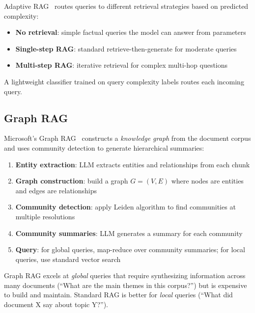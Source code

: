 Adaptive RAG~\cite{jeong2024adaptive} routes queries to different retrieval strategies based on predicted complexity:

\begin{itemize}
  \item \textbf{No retrieval}: simple factual queries the model can answer from parameters
  \item \textbf{Single-step RAG}: standard retrieve-then-generate for moderate queries
  \item \textbf{Multi-step RAG}: iterative retrieval for complex multi-hop questions
\end{itemize}

A lightweight classifier trained on query complexity labels routes each incoming query.

\subsection{Graph RAG}
\label{graph-rag}

Microsoft’s Graph RAG~\cite{edge2024local} constructs a \emph{knowledge graph} from the document corpus and uses community detection to generate hierarchical summaries:

\begin{enumerate}
  \item \textbf{Entity extraction}: LLM extracts entities and relationships from each chunk
  \item \textbf{Graph construction}: build a graph $G = (V, E)$ where nodes are entities and edges are relationships
  \item \textbf{Community detection}: apply Leiden algorithm to find communities at multiple resolutions
  \item \textbf{Community summaries}: LLM generates a summary for each community
  \item \textbf{Query}: for global queries, map-reduce over community summaries; for local queries, use standard vector search
\end{enumerate}

\begin{keybox}
Graph RAG excels at \emph{global} queries that require synthesizing information across many documents (``What are the main themes in this corpus?'') but is expensive to build and maintain. Standard RAG is better for \emph{local} queries (``What did document X say about topic Y?'').
\end{keybox}

